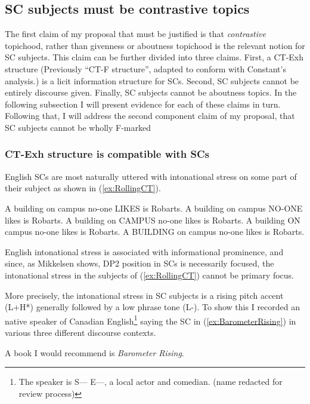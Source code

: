 \documentclass[
	letterpaper,
]{article}
\begin{document}
\subsection{SC subjects must be contrastive topics}
The first claim of my proposal that must be justified is that \textit{contrastive} topichood, rather than givenness or aboutness topichood is the relevant notion for SC subjects.
This claim can be further divided into three claims.
First, a CT-Exh structure (Previously ``CT-F structure'', adapted to conform with Constant's analysis.) is a licit information structure for SCs.
Second, SC subjects cannot be entirely discourse given.
Finally, SC subjects cannot be aboutness topics.
In the following subsection I will present evidence for each of these claims in turn.
Following that, I will address the second component claim of my proposal, that SC subjects cannot be wholly F-marked
\subsubsection{CT-Exh structure is compatible with SCs}\label{sec:CanBeCTs}
English SCs are most naturally uttered with intonational stress on some part of their subject as shown in (\ref{ex:RollingCT}).
\begin{exe}
	\ex\label{ex:RollingCT}
	\begin{xlist}
		\ex A building on campus no-one LIKES is Robarts.
		\ex A building on campus NO-ONE likes is Robarts.
		\ex A building on CAMPUS no-one likes is Robarts.
		\ex A building ON campus no-one likes is Robarts.
		\ex A BUILDING on campus no-one likes is Robarts.
	\end{xlist}
\end{exe}

English intonational stress is associated with informational prominence, and since, as Mikkelsen shows, DP2 position in SCs is necessarily focused, the intonational stress in the subjects of (\ref{ex:RollingCT}) cannot be primary focus.

More precisely, the intonational stress in SC subjects is a rising pitch accent (L+H*) generally followed by a low phrase tone (L-).
To show this I recorded an native speaker of Canadian English\footnote{
	The speaker is  S--- E---, a local actor and comedian. (name redacted for review process)
} saying the SC in (\ref{ex:BarometerRising}) in various three different discourse contexts.
\begin{exe}
	\ex \label{ex:BarometerRising} A book I would recommend is \textit{Barometer Rising}.
\end{exe}
\end{document}
